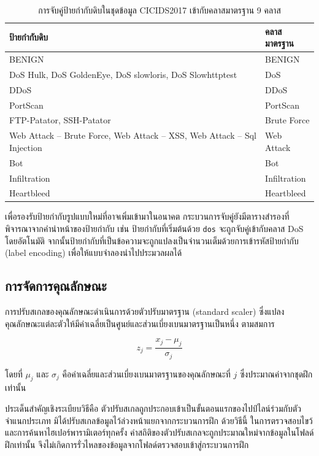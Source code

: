 \begin{table}[ht]
    \caption{การจับคู่ป้ายกำกับดิบในชุดข้อมูล CICIDS2017 เข้ากับคลาสมาตรฐาน 9 คลาส}
    \label{tab:label-mapping}
    \small
    \begin{tabularx}{\linewidth}{@{}X l@{}}
        \hline
        \textbf{ป้ายกำกับดิบ} & \textbf{คลาสมาตรฐาน} \\
        \hline
        BENIGN & BENIGN \\
        DoS Hulk, DoS GoldenEye, DoS slowloris, DoS Slowhttptest & DoS \\
        DDoS & DDoS \\
        PortScan & PortScan \\
        FTP-Patator, SSH-Patator & Brute Force \\
        Web Attack -- Brute Force, Web Attack -- XSS, Web Attack -- Sql Injection & Web Attack \\
        Bot & Bot \\
        Infiltration & Infiltration \\
        Heartbleed & Heartbleed \\
        \hline
    \end{tabularx}
\end{table}

เพื่อรองรับป้ายกำกับรูปแบบใหม่ที่อาจเพิ่มเข้ามาในอนาคต กระบวนการจับคู่ยังมีตารางสำรองที่พิจารณาจากคำนำหน้าของป้ายกำกับ เช่น ป้ายกำกับที่เริ่มต้นด้วย \texttt{dos} จะถูกจับคู่เข้ากับคลาส DoS โดยอัตโนมัติ จากนั้นป้ายกำกับที่เป็นข้อความจะถูกแปลงเป็นจำนวนเต็มด้วยการเข้ารหัสป้ายกำกับ (label encoding) เพื่อให้แบบจำลองนำไปประมวลผลได้

\subsection{การจัดการคุณลักษณะ}

การปรับสเกลของคุณลักษณะดำเนินการด้วยตัวปรับมาตรฐาน (standard scaler) ซึ่งแปลงคุณลักษณะแต่ละตัวให้มีค่าเฉลี่ยเป็นศูนย์และส่วนเบี่ยงเบนมาตรฐานเป็นหนึ่ง ตามสมการ

\begin{equation}
    z_{j} = \frac{x_{j} - \mu_{j}}{\sigma_{j}}
\end{equation}

โดยที่ $\mu_{j}$ และ $\sigma_{j}$ คือค่าเฉลี่ยและส่วนเบี่ยงเบนมาตรฐานของคุณลักษณะที่ $j$ ซึ่งประมาณค่าจากชุดฝึกเท่านั้น

ประเด็นสำคัญเชิงระเบียบวิธีคือ ตัวปรับสเกลถูกประกอบเข้าเป็นขั้นตอนแรกของไปป์ไลน์ร่วมกับตัวจำแนกประเภท มิได้ปรับสเกลข้อมูลไว้ล่วงหน้าแยกจากกระบวนการฝึก ด้วยวิธีนี้ ในการตรวจสอบไขว้และการค้นหาไฮเปอร์พารามิเตอร์ทุกครั้ง ค่าสถิติของตัวปรับสเกลจะถูกประมาณใหม่จากข้อมูลในโฟลด์ฝึกเท่านั้น จึงไม่เกิดการรั่วไหลของข้อมูลจากโฟลด์ตรวจสอบเข้าสู่กระบวนการฝึก \cite{pedregosa2011scikit}

